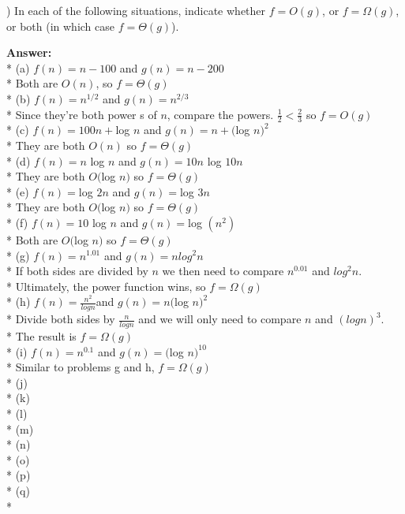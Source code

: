 \documentclass{article}
\begin{document}

\vspace{.2in}


\vspace{.2in}
) In each of the following situations, indicate whether $f  = O(g)$, or $f = \Omega(g)$, 
\indent or both (in which case $f = \Theta(g)$).

\vspace{.1in}
{\bf Answer:} \\*
\indent (a) $f(n) = n - 100$ and $g(n) = n - 200$ \\*
\indent \indent Both are $O(n)$, so $f = \Theta(g)$ \\*
\indent (b) $f(n) = n^{1/2}$ and $g(n) = n^{2/3}$\\*
\indent \indent Since they're both power s of $n$, compare the powers. $\frac{1}{2} < \frac{2}{3}$ so $f = O(g)$ \\*
\indent (c) $f(n) = 100n + $log $n$ and $g(n) = n + ($log $n)^2$\\*
\indent \indent They are both $O(n)$ so $f = \Theta(g)$ \\*
\indent (d) $f(n)  = n$ log $n$ and $g(n) = 10n$ log $10n$\\*
\indent \indent They are both $O($log $n)$ so $f = \Theta(g)$ \\*
\indent (e) $f(n) = $log $2n$ and $g(n) = $log $3n$\\*
\indent \indent They are both $O($log $n)$ so $f = \Theta(g)$ \\*
\indent (f) $f(n) = 10$ log $n$ and $g(n) = $log $(n^2)$ \\*
\indent \indent Both are $O($log $n)$ so $f = \Theta(g)$ \\*
\indent (g) $f(n) = n^{1.01}$ and $g(n) = n log^2n$\\*
\indent \indent If both sides are divided by $n$ we then need to compare $n^{0.01}$ and $log^2n$. \\*
\indent \indent Ultimately, the power function wins, so $f = \Omega(g)$\\*
\indent (h) $f(n) = \frac{n^2}{logn}$and $g(n) = n($log $n)^2$\\*
\indent \indent Divide both sides by $\frac{n}{logn}$ and we will only need to compare $n$ and $(logn)^3$. \\*
\indent \indent The result is $f = \Omega(g)$\\*
\indent (i) $f(n) = n^0.1$ and $g(n) = ($log $n)^{10}$\\*
\indent \indent Similar to problems g and h, $f = \Omega(g)$\\*
\indent (j) \\*
\indent (k) \\*
\indent (l) \\*
\indent (m) \\*
\indent (n) \\*
\indent (o) \\*
\indent (p) \\*
\indent (q) \\*
\end{document}
